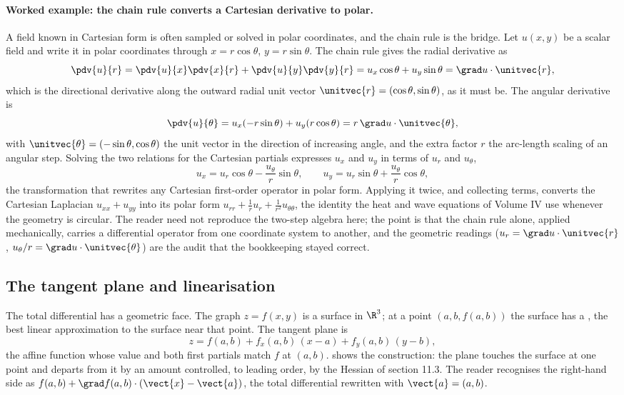\paragraph{Worked example: the chain rule converts a Cartesian
derivative to polar.} A field known in Cartesian form is often sampled or
solved in polar coordinates, and the chain rule is the bridge. Let
$u(x, y)$ be a scalar field and write it in polar coordinates through
$x = r\cos\theta$, $y = r\sin\theta$. The chain rule gives the radial
derivative as
\[
\pdv{u}{r} = \pdv{u}{x}\pdv{x}{r} + \pdv{u}{y}\pdv{y}{r}
= u_{x}\cos\theta + u_{y}\sin\theta = \grad u \cdot \unitvec{r},
\]
which is the directional derivative along the outward radial unit vector
$\unitvec{r} = (\cos\theta, \sin\theta)$, as it must be. The angular
derivative is
\[
\pdv{u}{\theta} = u_{x}(-r\sin\theta) + u_{y}(r\cos\theta)
= r\,\grad u\cdot\unitvec{\theta},
\]
with $\unitvec{\theta} = (-\sin\theta, \cos\theta)$ the unit vector in the
direction of increasing angle, and the extra factor $r$ the arc-length
scaling of an angular step. Solving the two relations for the Cartesian
partials expresses $u_{x}$ and $u_{y}$ in terms of $u_{r}$ and
$u_{\theta}$,
\[
u_{x} = u_{r}\cos\theta - \frac{u_{\theta}}{r}\sin\theta,
\qquad
u_{y} = u_{r}\sin\theta + \frac{u_{\theta}}{r}\cos\theta,
\]
the transformation that rewrites any Cartesian first-order operator in
polar form. Applying it twice, and collecting terms, converts the
Cartesian Laplacian $u_{xx} + u_{yy}$ into its polar form
$u_{rr} + \tfrac{1}{r}u_{r} + \tfrac{1}{r^{2}}u_{\theta\theta}$, the
identity the heat and wave equations of Volume IV use whenever the
geometry is circular. The reader need not reproduce the two-step algebra
here; the point is that the chain rule alone, applied mechanically,
carries a differential operator from one coordinate system to another,
and the geometric readings ($u_{r} = \grad u\cdot\unitvec{r}$,
$u_{\theta}/r = \grad u\cdot\unitvec{\theta}$) are the audit that the
bookkeeping stayed correct.

\subsection{The tangent plane and linearisation}

The total differential has a geometric face. The graph $z = f(x, y)$
is a surface in $\R^{3}$; at a point $(a, b, f(a, b))$ the surface
has a , the best linear approximation to the
surface near that point. The tangent plane is
\[
z = f(a, b) + f_{x}(a, b)\,(x - a) + f_{y}(a, b)\,(y - b),
\]
the affine function whose value and both first partials match $f$ at
$(a, b)$.  shows the construction:
the plane touches the surface at one point and departs from it by an
amount controlled, to leading order, by the Hessian of section 11.3.
The reader recognises the right-hand side as $f(a, b) + \grad f(a, b)
\cdot (\vect{x} - \vect{a})$, the total differential rewritten with
$\vect{a} = (a, b)$.


